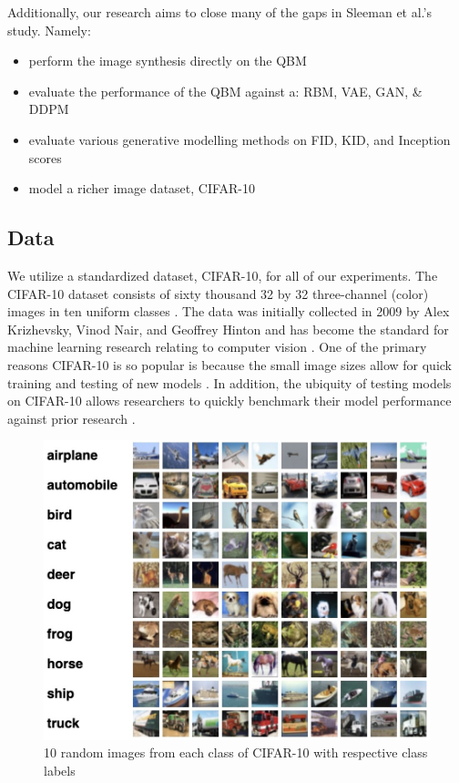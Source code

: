 \documentclass[%
 reprint,
 amsmath,amssymb,
 aps,
]{revtex4-2}
\begin{document}
Additionally, our research aims to close many of the gaps in Sleeman et al.'s study. Namely:

\begin{itemize}
    \item perform the image synthesis directly on the QBM
    \item evaluate the performance of the QBM against a: RBM, VAE, GAN, \& DDPM
    \item evaluate various generative modelling methods on FID, KID, and Inception scores
    \item model a richer image dataset, CIFAR-10
\end{itemize}

\subsection{Data}
We utilize a standardized dataset, CIFAR-10, for all of our experiments. The CIFAR-10 dataset consists of sixty thousand 32 by 32 three-channel (color) images in ten uniform classes \cite{CIFAR}. The data was initially collected in 2009 by Alex Krizhevsky, Vinod Nair, and Geoffrey Hinton and has become the standard for machine learning research relating to computer vision \cite{Krizhevsky09learningmultiple}. One of the primary reasons CIFAR-10 is so popular is because the small image sizes allow for quick training and testing of new models \cite{ai_progress_measurement}. In addition, the ubiquity of testing models on CIFAR-10 allows researchers to quickly benchmark their model performance against prior research \cite{ai_progress_measurement}.

\begin{figure}[h]
    \includegraphics[width=0.9\columnwidth]{cifar10.jpeg}
    \caption{\label{fig:cifar10} 10 random images from each class of CIFAR-10 with respective class labels \cite{CIFAR}}
\end{figure}
\end{document}
